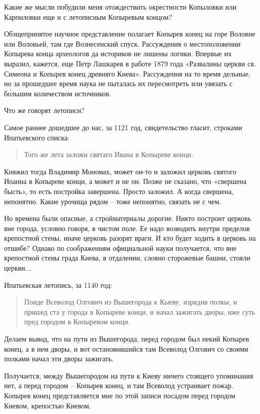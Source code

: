 \documentclass[a5paper,11pt,openany]{article}
\begin{document}
Какие же мысли побудили меня отождествить окрестности Копыловки или Карпиловки еще и с летописным Копыревым концом?

Обзщепринятое научное представление полагает Копырев конец на горе Воловне или Воловьей, там где Вознесенский спуск. Рассуждения о местоположении Копырева конца археологов да историков не лишены логики. Впервые их выразил, кажется, еще Петр Лашкарев в работе 1879 года «Развалины церкви св. Симеона и Копырев конец древняго Киева». Рассуждения на то время дельные, но за прошедшее время наука не пыталась их пересмотреть или увязать с б\'ольшим количеством источников.

Что же говорят летописи?

Самое раннее дошедшее до нас, за 1121 год, свидетельство гласит, строками Ипатьевского списка: 

\begin{quotation}
\noindent Того же лета заложи святаго Ивана в Копыреве конци.
\end{quotation}

Княжил тогда Владимир Мономах, может он-то и заложил церковь святого Иоанна в Копыреве конци, а может и не он. Позже не сказано, что «свершена бысть», то есть постройка завершена. Просто заложил. А когда свершена, непонятно. Какие урочища рядом – тоже непонятно, связать не с чем. 

Но времена были опасные, а стройматериалы дорогие. Никто построит церковь вне города, условно говоря, в чистом поле. Ее надо возводить внутри пределов крепостной стены, иначе церковь разорят враги. И кто будет ходить в церковь на отшибе? Однако по соображениям официальной науки получается, что вне крепостной стены града Киева, в отдалении, словно сторожевые башни, стояли церкви...

Ипатьевская летопись, за 1140 год:

\begin{quotation}
\noindent Поиде Всеволод Олгович из Вышегорода к Кыеву, изрядив полкы, и пришед ста у города в Копыреве конци, и начал зажигать дворы, иже суть пред городом в Копыревом конци.
\end{quotation}

Делаем вывод, что на пути из Вышегорода, перед городом был некий Копырев конец, а в нем дворы, и вот остановившийся там Всеволод Олгович со своими полками начал эти дворы зажигать.

Получается, между Вышегородом на пути к Киеву ничего стоящего упоминания нет, а перед городом – Копырев конец, и там Всеволод устраивает пожар. Копырев конец представляется мне по этой записи посадом перед городом Киевом, крепостью Киевом.
\end{document}
